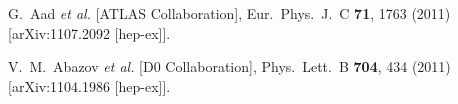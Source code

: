 \documentclass[aps,prl,preprint,groupedaddress]{revtex4}
\begin{document}

\begin{thebibliography}{99}
  G.~Aad {\it et al.}  [ATLAS Collaboration],
  Eur.\ Phys.\ J.\ C {\bf 71}, 1763 (2011)
  [arXiv:1107.2092 [hep-ex]].

  V.~M.~Abazov {\it et al.}  [D0 Collaboration],
  Phys.\ Lett.\ B {\bf 704}, 434 (2011)
  [arXiv:1104.1986 [hep-ex]].

\end{thebibliography}
\end{document}
